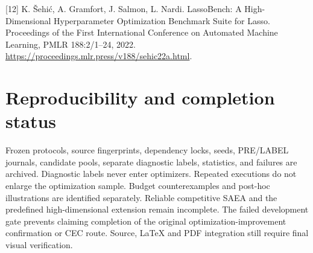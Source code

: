 \documentclass[11pt,a4paper]{article}
\begin{document}
{[}12{]} K. Šehić, A. Gramfort, J. Salmon, L. Nardi. LassoBench: A
High-Dimensional Hyperparameter Optimization Benchmark Suite for Lasso.
Proceedings of the First International Conference on Automated Machine
Learning, PMLR 188:2/1--24, 2022.
\url{https://proceedings.mlr.press/v188/sehic22a.html}.

\hypertarget{reproducibility-and-completion-status}{%
\section{Reproducibility and completion
status}\label{reproducibility-and-completion-status}}

Frozen protocols, source fingerprints, dependency locks, seeds,
PRE/LABEL journals, candidate pools, separate diagnostic labels,
statistics, and failures are archived. Diagnostic labels never enter
optimizers. Repeated executions do not enlarge the optimization sample.
Budget counterexamples and post-hoc illustrations are identified
separately. Reliable competitive SAEA and the predefined
high-dimensional extension remain incomplete. The failed development
gate prevents claiming completion of the original
optimization-improvement confirmation or CEC route. Source, LaTeX and
PDF integration still require final visual verification.
\end{document}
